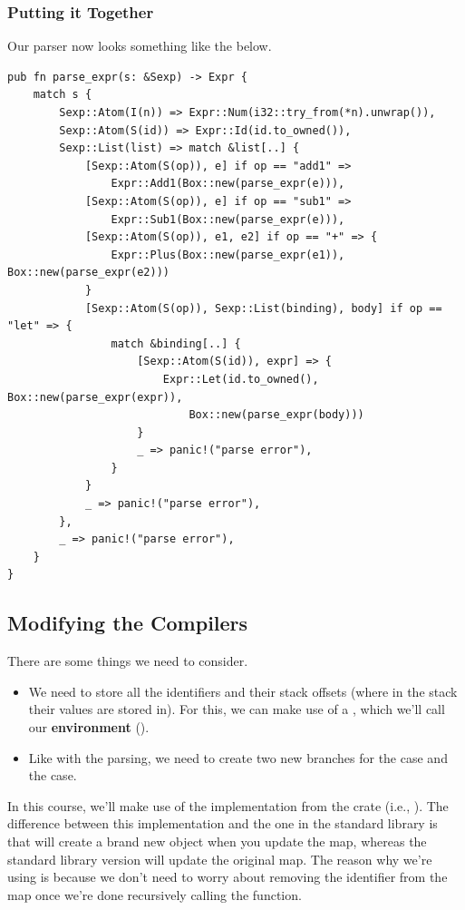 \documentclass[letterpaper]{article}
\begin{document}
\subsubsection{Putting it Together}
Our parser now looks something like the below.
\begin{verbatim}
pub fn parse_expr(s: &Sexp) -> Expr {
    match s {
        Sexp::Atom(I(n)) => Expr::Num(i32::try_from(*n).unwrap()),
        Sexp::Atom(S(id)) => Expr::Id(id.to_owned()),
        Sexp::List(list) => match &list[..] {
            [Sexp::Atom(S(op)), e] if op == "add1" => 
                Expr::Add1(Box::new(parse_expr(e))),
            [Sexp::Atom(S(op)), e] if op == "sub1" => 
                Expr::Sub1(Box::new(parse_expr(e))),
            [Sexp::Atom(S(op)), e1, e2] if op == "+" => {
                Expr::Plus(Box::new(parse_expr(e1)), Box::new(parse_expr(e2)))
            }
            [Sexp::Atom(S(op)), Sexp::List(binding), body] if op == "let" => {
                match &binding[..] {
                    [Sexp::Atom(S(id)), expr] => {
                        Expr::Let(id.to_owned(), Box::new(parse_expr(expr)), 
                            Box::new(parse_expr(body)))
                    }
                    _ => panic!("parse error"),
                }
            }
            _ => panic!("parse error"),
        },
        _ => panic!("parse error"),
    }
}\end{verbatim}

\subsection{Modifying the Compilers}
There are some things we need to consider. 
\begin{itemize}
    \item We need to store all the identifiers and their stack offsets (where in the stack their values are stored in). For this, we can make use of a , which we'll call our \textbf{environment} (). 
    \item Like with the parsing, we need to create two new branches for the  case and the  case.  
\end{itemize}
In this course, we'll make use of the  implementation from the  crate (i.e., ). The difference between this  implementation and the one in the standard library is that  will create a brand new  object when you update the map, whereas the standard library version will update the original map. The reason why we're using  is because we don't need to worry about removing the identifier from the map once we're done recursively calling the  function.
\end{document}

